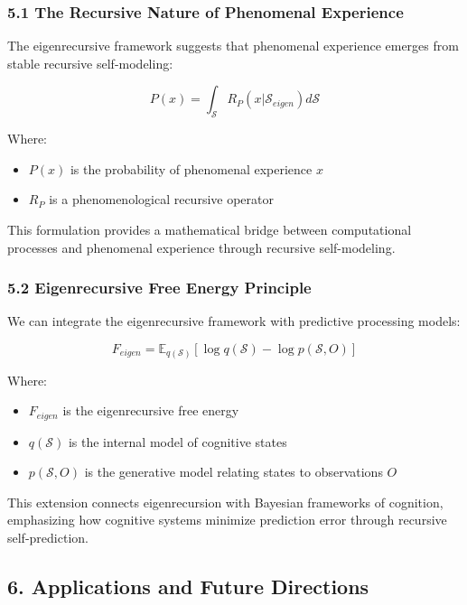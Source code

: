 \documentclass[
]{article}
\providecommand{\tightlist}{%
  \setlength{\itemsep}{0pt}\setlength{\parskip}{0pt}}
\begin{document}
\subsubsection{5.1 The Recursive Nature of Phenomenal
Experience}\label{the-recursive-nature-of-phenomenal-experience}

The eigenrecursive framework suggests that phenomenal experience emerges
from stable recursive self-modeling:

\[P(x) = \int_{\mathcal{S}} R_P(x|\mathcal{S}_{eigen})d\mathcal{S}\]

Where:

\begin{itemize}
\tightlist
\item
  \(P(x)\) is the probability of phenomenal experience \(x\)
\item
  \(R_P\) is a phenomenological recursive operator
\end{itemize}

This formulation provides a mathematical bridge between computational
processes and phenomenal experience through recursive self-modeling.

\subsubsection{5.2 Eigenrecursive Free Energy
Principle}\label{eigenrecursive-free-energy-principle}

We can integrate the eigenrecursive framework with predictive processing
models:

\[F_{eigen} = \mathbb{E}_{q(\mathcal{S})}[\log q(\mathcal{S}) - \log p(\mathcal{S}, O)]\]

Where:

\begin{itemize}
\tightlist
\item
  \(F_{eigen}\) is the eigenrecursive free energy
\item
  \(q(\mathcal{S})\) is the internal model of cognitive states
\item
  \(p(\mathcal{S}, O)\) is the generative model relating states to
  observations \(O\)
\end{itemize}

This extension connects eigenrecursion with Bayesian frameworks of
cognition, emphasizing how cognitive systems minimize prediction error
through recursive self-prediction.

\subsection{6. Applications and Future
Directions}\label{applications-and-future-directions}
\end{document}
